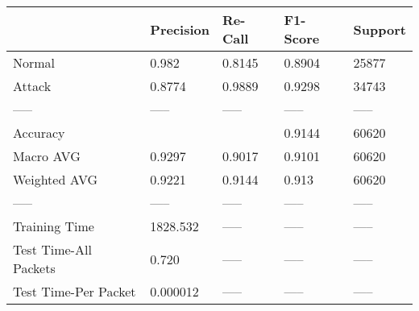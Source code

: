 \begin{tabular}{lllll}
\toprule
{} & Precision & Re-Call & F1-Score & Support \\
\midrule
Normal                &     0.982 &  0.8145 &   0.8904 &   25877 \\
Attack                &    0.8774 &  0.9889 &   0.9298 &   34743 \\
-----                 &     ----- &   ----- &    ----- &   ----- \\
Accuracy              &           &         &   0.9144 &   60620 \\
Macro AVG             &    0.9297 &  0.9017 &   0.9101 &   60620 \\
Weighted AVG          &    0.9221 &  0.9144 &    0.913 &   60620 \\
-----                 &     ----- &   ----- &    ----- &   ----- \\
Training Time         &  1828.532 &   ----- &    ----- &   ----- \\
Test Time-All Packets &     0.720 &   ----- &    ----- &   ----- \\
Test Time-Per Packet  &  0.000012 &   ----- &    ----- &   ----- \\
\bottomrule
\end{tabular}
